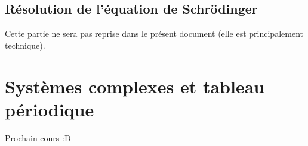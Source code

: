  
\subsection{Résolution de l'équation de Schrödinger}
Cette partie ne sera pas reprise dans le présent document (elle est principalement technique).


\section{Systèmes complexes et tableau périodique}
Prochain cours :D

